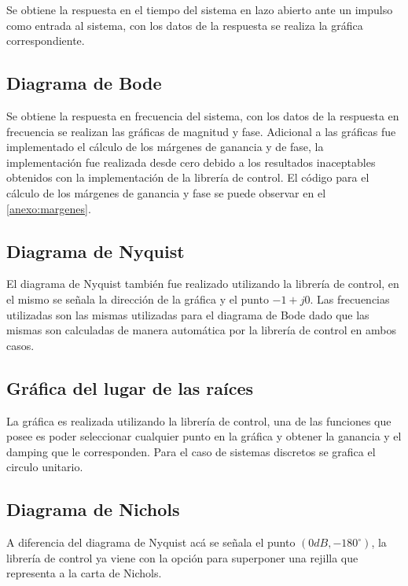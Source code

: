         Se obtiene la respuesta en el tiempo del sistema en lazo abierto ante un impulso como entrada al sistema, con los datos de la respuesta se realiza la gráfica correspondiente.

    \subsection{Diagrama de Bode}
        
        Se obtiene la respuesta en frecuencia del sistema, con los datos de la respuesta en frecuencia se realizan las gráficas de magnitud y fase. Adicional a las gráficas fue implementado el cálculo de los márgenes de ganancia y de fase, la implementación fue realizada desde cero debido a los resultados inaceptables obtenidos con la implementación de la librería de control. El código para el cálculo de los márgenes de ganancia y fase se puede observar en el \ref{anexo:margenes}.
    
    \subsection{Diagrama de Nyquist}
        
        El diagrama de Nyquist también fue realizado utilizando la librería de control, en el mismo se señala la dirección de la gráfica y el punto $-1 + j0$. Las frecuencias utilizadas son las mismas utilizadas para el diagrama de Bode dado que las mismas son calculadas de manera automática por la librería de control en ambos casos.
    
    \subsection{Gráfica del lugar de las raíces}
        
        La gráfica es realizada utilizando la librería de control, una de las funciones que posee es poder seleccionar cualquier punto en la gráfica y obtener la ganancia y el damping que le corresponden. Para el caso de sistemas discretos se grafica el circulo unitario.
    
    \subsection{Diagrama de Nichols}
        
        A diferencia del diagrama de Nyquist acá se señala el punto $(0dB, -180^\circ)$, la librería de control ya viene con la opción para superponer una rejilla que representa a la carta de Nichols.

